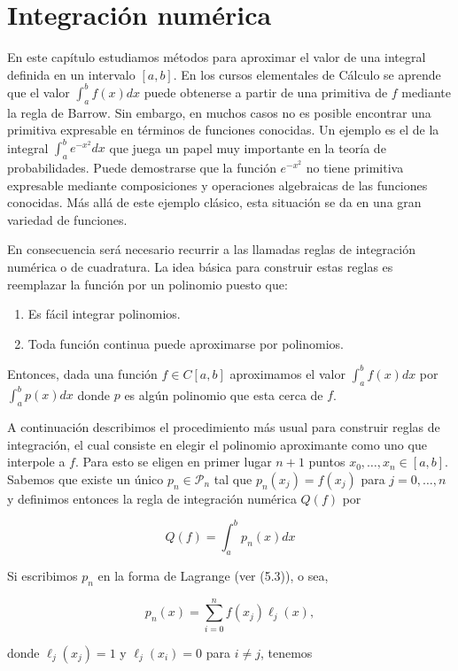 \documentclass[10pt]{book}
\begin{document}
\chapter{Integración numérica}
En este capítulo estudiamos métodos para aproximar el valor de una integral definida en un intervalo $[a, b]$. En los cursos elementales de Cálculo se aprende que el valor $\int_{a}^{b} f(x) d x$ puede obtenerse a partir de una primitiva de $f$ mediante la regla de Barrow. Sin embargo, en muchos casos no es posible encontrar una primitiva expresable en términos de funciones conocidas. Un ejemplo es el de la integral $\int_{a}^{b} e^{-x^{2}} d x$ que juega un papel muy importante en la teoría de probabilidades. Puede demostrarse que la función $e^{-x^{2}}$ no tiene primitiva expresable mediante composiciones y operaciones algebraicas de las funciones conocidas. Más allá de este ejemplo clásico, esta situación se da en una gran variedad de funciones.

En consecuencia será necesario recurrir a las llamadas reglas de integración numérica o de cuadratura. La idea básica para construir estas reglas es reemplazar la función por un polinomio puesto que:

\begin{enumerate}
  \item Es fácil integrar polinomios.
  \item Toda función continua puede aproximarse por polinomios.
\end{enumerate}

Entonces, dada una función $f \in C[a, b]$ aproximamos el valor $\int_{a}^{b} f(x) d x$ por $\int_{a}^{b} p(x) d x$ donde $p$ es algún polinomio que esta cerca de $f$.

A continuación describimos el procedimiento más usual para construir reglas de integración, el cual consiste en elegir el polinomio aproximante como uno que interpole a $f$. Para esto se eligen en primer lugar $n+1$ puntos $x_{0}, \ldots, x_{n} \in[a, b]$. Sabemos que existe un único $p_{n} \in \mathcal{P}_{n}$ tal que $p_{n}\left(x_{j}\right)=f\left(x_{j}\right)$ para $j=0, \ldots, n$ y definimos entonces la regla de integración numérica $Q(f)$ por

$$
Q(f)=\int_{a}^{b} p_{n}(x) d x
$$

Si escribimos $p_{n}$ en la forma de Lagrange (ver (5.3)), o sea,

$$
p_{n}(x)=\sum_{i=0}^{n} f\left(x_{j}\right) \ell_{j}(x),
$$

donde $\ell_{j}\left(x_{j}\right)=1$ y $\ell_{j}\left(x_{i}\right)=0$ para $i \neq j$, tenemos
\end{document}
